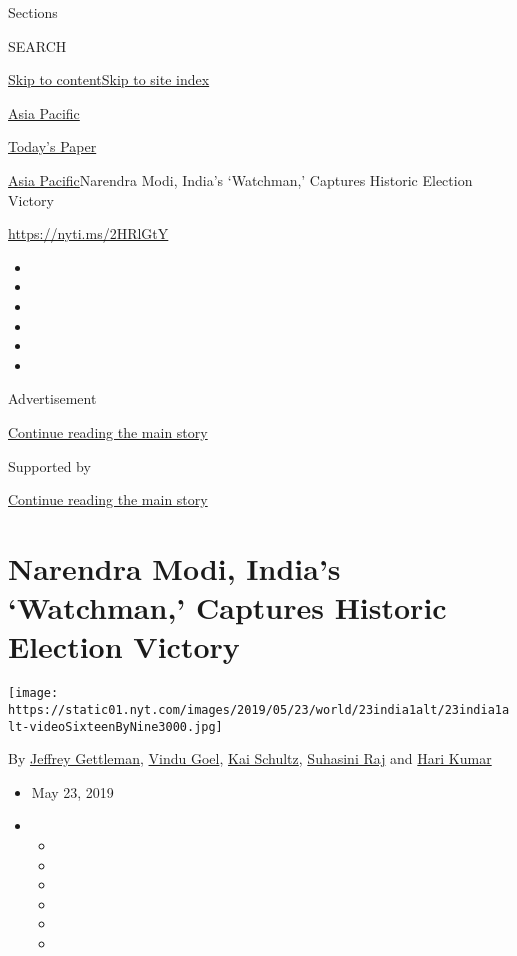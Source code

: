 Sections

SEARCH

\protect\hyperlink{site-content}{Skip to
content}\protect\hyperlink{site-index}{Skip to site index}

\href{https://www.nytimes.com/section/world/asia}{Asia Pacific}

\href{https://myaccount.nytimes.com/auth/login?response_type=cookie\&client_id=vi}{}

\href{https://www.nytimes.com/section/todayspaper}{Today's Paper}

\href{/section/world/asia}{Asia Pacific}\textbar{}Narendra Modi, India's
`Watchman,' Captures Historic Election Victory

\url{https://nyti.ms/2HRlGtY}

\begin{itemize}
\item
\item
\item
\item
\item
\item
\end{itemize}

Advertisement

\protect\hyperlink{after-top}{Continue reading the main story}

Supported by

\protect\hyperlink{after-sponsor}{Continue reading the main story}

\hypertarget{narendra-modi-indias-watchman-captures-historic-election-victory}{%
\section{Narendra Modi, India's `Watchman,' Captures Historic Election
Victory}\label{narendra-modi-indias-watchman-captures-historic-election-victory}}

\texttt{[image: https://static01.nyt.com/images/2019/05/23/world/23india1alt/23india1alt-videoSixteenByNine3000.jpg]}

By \href{https://www.nytimes.com/by/jeffrey-gettleman}{Jeffrey
Gettleman}, \href{https://www.nytimes.com/by/vindu-goel}{Vindu Goel},
\href{https://www.nytimes.com/by/kai-schultz}{Kai Schultz},
\href{https://www.nytimes.com/by/suhasini-raj}{Suhasini Raj} and
\href{https://www.nytimes.com/by/hari-kumar}{Hari Kumar}

\begin{itemize}
\item
  May 23, 2019
\item
  \begin{itemize}
  \item
  \item
  \item
  \item
  \item
  \item
  \end{itemize}
\end{itemize}

